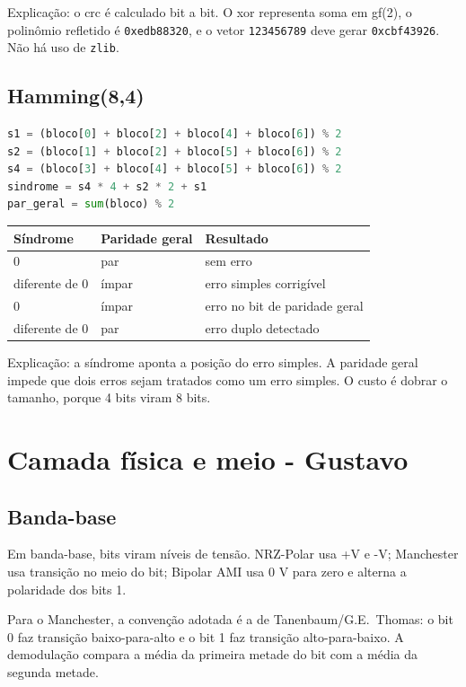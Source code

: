 \documentclass[10pt,a4paper]{article}
\begin{document}
Explicação: o crc é calculado bit a bit. O xor representa soma em gf(2), o
polinômio refletido é \texttt{0xedb88320}, e o vetor \texttt{123456789} deve
gerar \texttt{0xcbf43926}. Não há uso de \texttt{zlib}.

\subsection{Hamming(8,4)}

\begin{lstlisting}[language=Python]
s1 = (bloco[0] + bloco[2] + bloco[4] + bloco[6]) % 2
s2 = (bloco[1] + bloco[2] + bloco[5] + bloco[6]) % 2
s4 = (bloco[3] + bloco[4] + bloco[5] + bloco[6]) % 2
sindrome = s4 * 4 + s2 * 2 + s1
par_geral = sum(bloco) % 2
\end{lstlisting}

\begin{tabular}{p{3cm}p{3cm}p{7cm}}
\toprule
\textbf{Síndrome} & \textbf{Paridade geral} & \textbf{Resultado} \\
\midrule
0 & par & sem erro \\
diferente de 0 & ímpar & erro simples corrigível \\
0 & ímpar & erro no bit de paridade geral \\
diferente de 0 & par & erro duplo detectado \\
\bottomrule
\end{tabular}

Explicação: a síndrome aponta a posição do erro simples. A paridade geral
impede que dois erros sejam tratados como um erro simples. O custo é dobrar o
tamanho, porque 4 bits viram 8 bits.

\section{Camada física e meio - Gustavo}

\subsection{Banda-base}

Em banda-base, bits viram níveis de tensão. NRZ-Polar usa +V e -V; Manchester
usa transição no meio do bit; Bipolar AMI usa 0 V para zero e alterna a
polaridade dos bits 1.

Para o Manchester, a convenção adotada é a de Tanenbaum/G.E.~Thomas: o bit 0
faz transição baixo-para-alto e o bit 1 faz transição alto-para-baixo. A
demodulação compara a média da primeira metade do bit com a média da segunda
metade.
\end{document}
